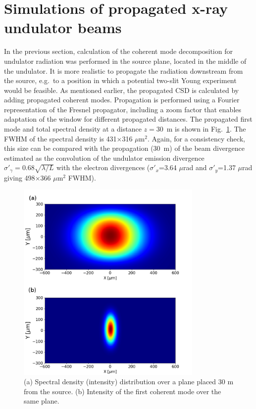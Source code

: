 \documentclass[%
 reprint,
 amsmath,amssymb,
 aps,
]{revtex4-1}
\begin{document}
\section{Simulations of propagated x-ray undulator beams}

In the previous section, calculation of the coherent mode decomposition for undulator radiation was performed in the source plane, located in the middle of the undulator. It is more realistic to propagate the radiation downstream from the source, e.g.~to a position in which a potential two-slit Young experiment would be feasible. As mentioned earlier, the propagated CSD is calculated by adding  propagated coherent modes. Propagation is performed using a Fourier representation of the Fresnel propagator, including a zoom factor \cite{schmidt,pirro} that enables adaptation of the window for different propagated distances. The propagated first mode and total spectral density at a distance $z=30$~m is shown in Fig.~\ref{spectral_density_propagated}. The FWHM of the spectral density is 431$\times$316 $\mu$m$^2$. Again, for a consistency check, this size can be compared with the propagation (30~m) of the beam divergence estimated as the convolution of the undulator emission divergence $\sigma'_\gamma=0.68\sqrt{\lambda/L}$ with the electron divergences ($\sigma'_x$=3.64 $\mu$rad and $\sigma'_y$=1.37 $\mu$rad giving 498$\times$366 $\mu$m$^2$ FWHM). 

\begin{figure}
\includegraphics[width=9.0cm]{Figures/spectral_density_propagated.png}
\caption{(a) Spectral density (intensity) distribution over a plane placed 30 m from the source. (b) Intensity of the first coherent mode over the same plane.}
\label{spectral_density_propagated}%
\end{figure}
\end{document}
